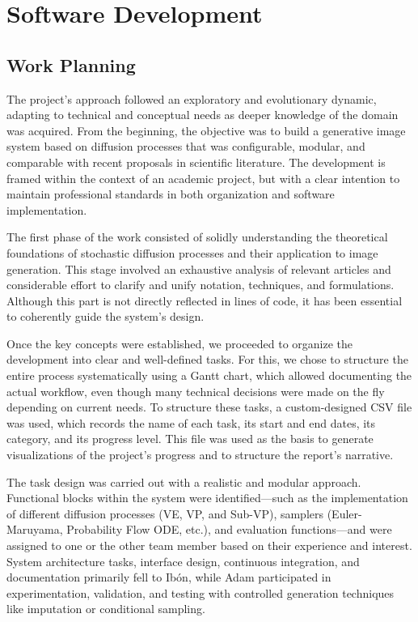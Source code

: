 \documentclass[11pt,a4paper]{article}
\begin{document}
\section{Software Development}
\subsection{Work Planning}
The project's approach followed an exploratory and evolutionary dynamic, adapting to technical and conceptual needs as deeper knowledge of the domain was acquired. From the beginning, the objective was to build a generative image system based on diffusion processes that was configurable, modular, and comparable with recent proposals in scientific literature. The development is framed within the context of an academic project, but with a clear intention to maintain professional standards in both organization and software implementation.

The first phase of the work consisted of solidly understanding the theoretical foundations of stochastic diffusion processes and their application to image generation. This stage involved an exhaustive analysis of relevant articles and considerable effort to clarify and unify notation, techniques, and formulations. Although this part is not directly reflected in lines of code, it has been essential to coherently guide the system's design.

Once the key concepts were established, we proceeded to organize the development into clear and well-defined tasks. For this, we chose to structure the entire process systematically using a Gantt chart, which allowed documenting the actual workflow, even though many technical decisions were made on the fly depending on current needs. To structure these tasks, a custom-designed CSV file was used, which records the name of each task, its start and end dates, its category, and its progress level. This file was used as the basis to generate visualizations of the project's progress and to structure the report's narrative.

The task design was carried out with a realistic and modular approach. Functional blocks within the system were identified—such as the implementation of different diffusion processes (VE, VP, and Sub-VP), samplers (Euler-Maruyama, Probability Flow ODE, etc.), and evaluation functions—and were assigned to one or the other team member based on their experience and interest. System architecture tasks, interface design, continuous integration, and documentation primarily fell to Ibón, while Adam participated in experimentation, validation, and testing with controlled generation techniques like imputation or conditional sampling.
\end{document}

